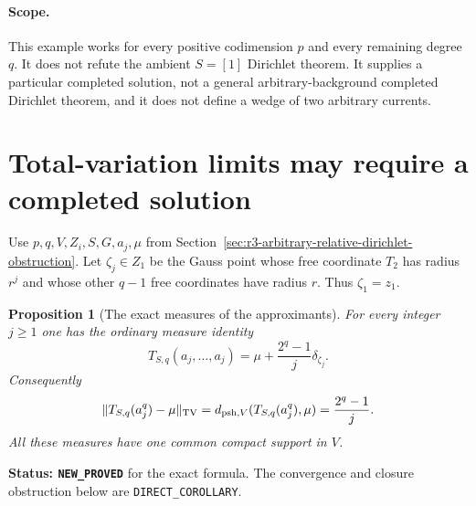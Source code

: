 \documentclass[11pt,a4paper]{article}
\numberwithin{equation}{section}
\newtheorem{proposition}[theorem]{Proposition}
\theoremstyle{definition}
\theoremstyle{remark}
\begin{document}
\paragraph{Scope.}
This example works for every positive codimension $p$ and every
remaining degree $q$. It does not refute the ambient $S=[1]$
Dirichlet theorem. It supplies a particular completed solution,
not a general arbitrary-background completed Dirichlet theorem,
and it does not define a wedge of two arbitrary currents.



\section{Total-variation limits may require a completed solution}
\label{sec:r3-relative-dirichlet-tv-limit}

Use $p,q,V,Z_i,S,G,a_j,\mu$ from
Section~\ref{sec:r3-arbitrary-relative-dirichlet-obstruction}.
Let $\zeta_j\in Z_1$ be the Gauss point whose free coordinate
$T_2$ has radius $r^j$ and whose other $q-1$ free coordinates
have radius $r$. Thus $\zeta_1=z_1$.

\begin{proposition}[The exact measures of the approximants]
\label{prop:r3-relative-dirichlet-tv-formula}
For every integer $j\geq1$ one has the ordinary measure identity
\begin{equation}
 T_{S,q}(a_j,\ldots,a_j)
      =\mu+\frac{2^q-1}{j}\delta_{\zeta_j}.
 \label{eq:r3-relative-dirichlet-tv-formula}
\end{equation}
Consequently
\begin{equation}
 \|T_{S,q}(a_j^q)-\mu\|_{\rm TV}
 =d_{\mathrm{psh},V}(T_{S,q}(a_j^q),\mu)
 =\frac{2^q-1}{j}.
 \label{eq:r3-relative-tv-and-dual}
\end{equation}
All these measures have one common compact support in $V$.
\end{proposition}

\noindent\textbf{Status: \texttt{NEW\_PROVED}} for the exact
formula. The convergence and closure obstruction below are
\texttt{DIRECT\_COROLLARY}.
\end{document}
